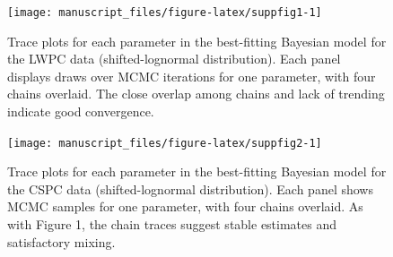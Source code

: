 \documentclass[
  ,man,floatsintext]{apa6}
\begin{document}
\begin{figure}[!h]
\texttt{[image: manuscript\_files/figure-latex/suppfig1-1]} \caption{Trace plots for each parameter in the best-fitting Bayesian model for the LWPC data (shifted-lognormal distribution). Each panel displays draws over MCMC iterations for one parameter, with four chains overlaid. The close overlap among chains and lack of trending indicate good convergence.}\label{fig:suppfig1}
\end{figure}

\begin{figure}[!h]
\texttt{[image: manuscript\_files/figure-latex/suppfig2-1]} \caption{Trace plots for each parameter in the best-fitting Bayesian model for the CSPC data (shifted-lognormal distribution). Each panel shows MCMC samples for one parameter, with four chains overlaid. As with Figure 1, the chain traces suggest stable estimates and satisfactory mixing.}\label{fig:suppfig2}
\end{figure}
\end{document}
